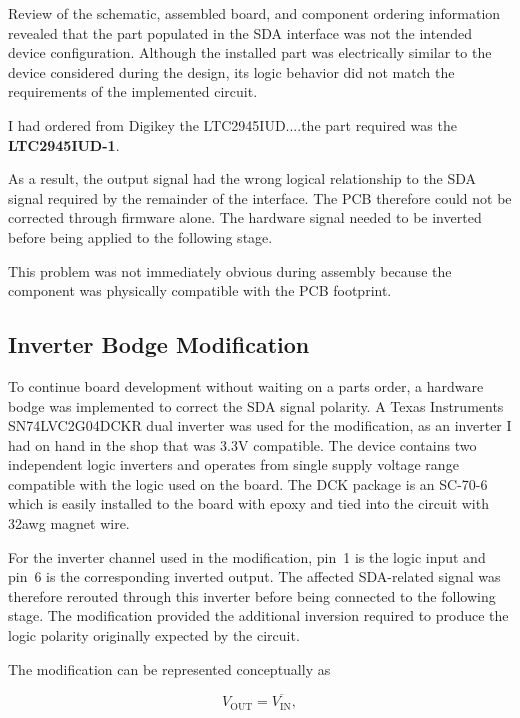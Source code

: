 Review of the schematic, assembled board, and component ordering information revealed
that the part populated in the SDA interface was not the intended device configuration.
Although the installed part was electrically similar to the device considered during
the design, its logic behavior did not match the requirements of the implemented
circuit.

I had ordered from Digikey the LTC2945IUD....the part required was the \textbf{LTC2945IUD-1}.

As a result, the output signal had the wrong logical relationship to the SDA signal
required by the remainder of the interface. The PCB therefore could not be corrected
through firmware alone. The hardware signal needed to be inverted before being
applied to the following stage.

This problem was not immediately obvious during assembly because the component was
physically compatible with the PCB footprint.

\subsection{Inverter Bodge Modification}

To continue board development without waiting on a parts order, a hardware
bodge was implemented to correct the SDA signal polarity. A Texas Instruments\\ SN74LVC2G04DCKR dual inverter was used for the modification, as an inverter I had on hand in the shop that was 3.3V compatible. The device contains two
independent logic inverters and operates from single supply voltage range compatible with
the logic used on the board. The DCK package is an SC-70-6 which is easily installed to the board with epoxy and tied into the circuit with 32awg magnet wire.

For the inverter channel used in the modification, pin~1 is the logic input and
pin~6 is the corresponding inverted output. The affected SDA-related signal was
therefore rerouted through this inverter before being connected to the following
stage. The modification provided the additional inversion required to produce the
logic polarity originally expected by the circuit.

The modification can be represented conceptually as

\begin{equation}
	V_{\mathrm{OUT}} = \overline{V_{\mathrm{IN}}},
\end{equation}

